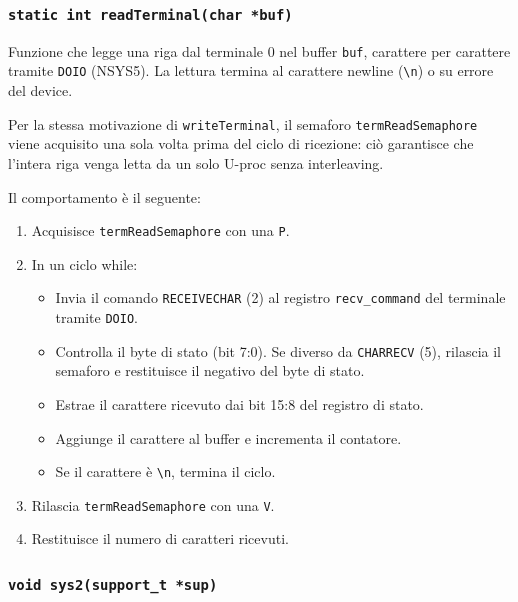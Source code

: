 \documentclass[a4paper,12pt]{article}
\begin{document}
\begin{enumerate}
 
\subsubsection{\texttt{static int readTerminal(char *buf)}}
 
Funzione  che legge una riga dal terminale 0 nel buffer
\texttt{buf}, carattere per carattere tramite \texttt{DOIO} (NSYS5). La lettura
termina al carattere newline (\texttt{\textbackslash n}) o su errore del device.
 
\medskip
Per la stessa motivazione di \texttt{writeTerminal}, il semaforo
\texttt{termReadSemaphore} viene acquisito una sola volta prima del ciclo di
ricezione: ciò garantisce che l'intera riga venga letta da un solo U-proc senza
interleaving.
 
\medskip
Il comportamento è il seguente:
 
\begin{enumerate}
    \item Acquisisce \texttt{termReadSemaphore} con una \texttt{P}.
    \item In un ciclo while:
    \begin{itemize}
        \item Invia il comando \texttt{RECEIVECHAR} (2) al registro
              \texttt{recv\_command} del terminale tramite \texttt{DOIO}.
        \item Controlla il byte di stato (bit 7:0). Se diverso da
              \texttt{CHARRECV} (5), rilascia il semaforo e restituisce il
              negativo del byte di stato.
        \item Estrae il carattere ricevuto dai bit 15:8 del registro di stato.
        \item Aggiunge il carattere al buffer e incrementa il contatore.
        \item Se il carattere è \texttt{\textbackslash n}, termina il ciclo.
    \end{itemize}
    \item Rilascia \texttt{termReadSemaphore} con una \texttt{V}.
    \item Restituisce il numero di caratteri ricevuti.
\end{enumerate}





\subsubsection{\texttt{void sys2(support\_t *sup)}}


\end{enumerate}
\end{document}
